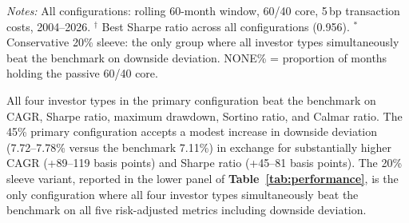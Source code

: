 \documentclass[12pt, a4paper]{article}
\begin{document}
\begin{table}[htbp]
\centering
\caption{Performance Summary --- Primary Configuration and Sensitivity Analysis}
\label{tab:performance}
\setlength{\tabcolsep}{3.5pt}
\footnotesize
{}
\begin{minipage}{\linewidth}
\vspace{4pt}\footnotesize
\textit{Notes:} All configurations: rolling 60-month window, 60/40 core, 5\,bp transaction costs, 2004--2026.
$^\dagger$ Best Sharpe ratio across all configurations (0.956).
$^{*}$ Conservative 20\% sleeve: the only group where all investor types simultaneously beat the benchmark on downside deviation.
NONE\% = proportion of months holding the passive 60/40 core.
\end{minipage}
\end{table}


 
 All four investor types in the primary configuration beat the benchmark on
 CAGR, Sharpe ratio, maximum drawdown, Sortino ratio, and Calmar ratio. The 45\% primary
 configuration accepts a modest increase in downside deviation (7.72--7.78\% versus the
 benchmark 7.11\%) in exchange for substantially higher CAGR (+89--119 basis points) and
 Sharpe ratio (+45--81 basis points). The 20\% sleeve variant, reported in the lower panel
 of \textbf{Table~\ref{tab:performance}}, is the only configuration where all four investor
 types simultaneously beat the benchmark on all five risk-adjusted metrics including downside deviation.
 
\end{document}
